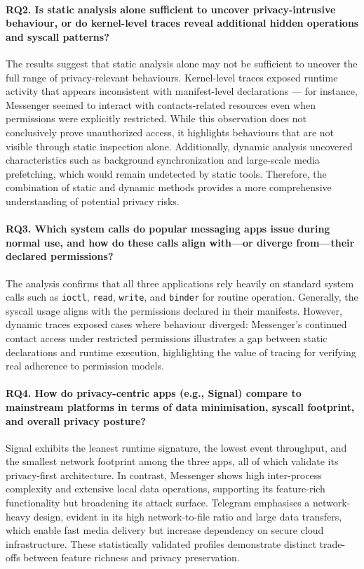 \documentclass[a4paper,12pt]{report}
\begin{document}
\paragraph{\textbf{RQ2.} Is static analysis alone sufficient to uncover privacy-intrusive behaviour, or do kernel-level traces reveal additional hidden operations and syscall patterns?}

The results suggest that static analysis alone may not be sufficient to uncover the full range of privacy-relevant behaviours. Kernel-level traces exposed runtime activity that appears inconsistent with manifest-level declarations — for instance, Messenger seemed to interact with contacts-related resources even when permissions were explicitly restricted. While this observation does not conclusively prove unauthorized access, it highlights behaviours that are not visible through static inspection alone. Additionally, dynamic analysis uncovered characteristics such as background synchronization and large-scale media prefetching, which would remain undetected by static tools. Therefore, the combination of static and dynamic methods provides a more comprehensive understanding of potential privacy risks.

\paragraph{\textbf{RQ3.} Which system calls do popular messaging apps issue during normal use, and how do these calls align with—or diverge from—their declared permissions?}

The analysis confirms that all three applications rely heavily on standard system calls such as \texttt{ioctl}, \texttt{read}, \texttt{write}, and \texttt{binder} for routine operation. Generally, the syscall usage aligns with the permissions declared in their manifests. However, dynamic traces exposed cases where behaviour diverged: Messenger's continued contact access under restricted permissions illustrates a gap between static declarations and runtime execution, highlighting the value of tracing for verifying real adherence to permission models.

\paragraph{\textbf{RQ4.} How do privacy-centric apps (e.g., Signal) compare to mainstream platforms in terms of data minimisation, syscall footprint, and overall privacy posture?}

Signal exhibits the leanest runtime signature, the lowest event throughput, and the smallest network footprint among the three apps, all of which validate its privacy-first architecture. In contrast, Messenger shows high inter-process complexity and extensive local data operations, supporting its feature-rich functionality but broadening its attack surface. Telegram emphasises a network-heavy design, evident in its high network-to-file ratio and large data transfers, which enable fast media delivery but increase dependency on secure cloud infrastructure. These statistically validated profiles demonstrate distinct trade-offs between feature richness and privacy preservation.
\end{document}
